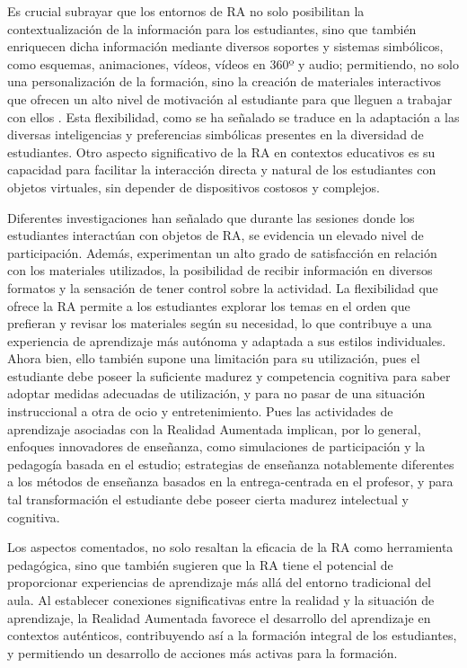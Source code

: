 \documentclass[spanish]{textolivre}
\begin{document}
Es crucial subrayar que los entornos de RA no solo posibilitan la contextualización de la información para los estudiantes, sino que también enriquecen dicha información mediante diversos soportes y sistemas simbólicos, como esquemas, animaciones, vídeos, vídeos en 360º y audio; permitiendo, no solo una personalización de la formación, sino la creación de materiales interactivos que ofrecen un alto nivel de motivación al estudiante para que lleguen a trabajar con ellos \cite{amores_valencia_2023,oueida2023augmented}. Esta flexibilidad, como se ha señalado se traduce en la adaptación a las diversas inteligencias y preferencias simbólicas presentes en la diversidad de estudiantes. Otro aspecto significativo de la RA en contextos educativos es su capacidad para facilitar la interacción directa y natural de los estudiantes con objetos virtuales, sin depender de dispositivos costosos y complejos.

Diferentes investigaciones han señalado que durante las sesiones donde los estudiantes interactúan con objetos de RA, se evidencia un elevado nivel de participación. Además, experimentan un alto grado de satisfacción en relación con los materiales utilizados, la posibilidad de recibir información en diversos formatos y la sensación de tener control sobre la actividad. La flexibilidad que ofrece la RA permite a los estudiantes explorar los temas en el orden que prefieran y revisar los materiales según su necesidad, lo que contribuye a una experiencia de aprendizaje más autónoma y adaptada a sus estilos individuales. Ahora bien, ello también supone una limitación para su utilización, pues el estudiante debe poseer la suficiente madurez y competencia cognitiva para saber adoptar medidas adecuadas de utilización, y para no pasar de una situación instruccional a otra de ocio y entretenimiento. Pues las actividades de aprendizaje asociadas con la Realidad Aumentada implican, por lo general, enfoques innovadores de enseñanza, como simulaciones de participación y la pedagogía basada en el estudio; estrategias de enseñanza notablemente diferentes a los métodos de enseñanza basados en la entrega-centrada en el profesor, y para tal transformación el estudiante debe poseer cierta madurez intelectual y cognitiva.

Los aspectos comentados, no solo resaltan la eficacia de la RA como herramienta pedagógica, sino que también sugieren que la RA tiene el potencial de proporcionar experiencias de aprendizaje más allá del entorno tradicional del aula. Al establecer conexiones significativas entre la realidad y la situación de aprendizaje, la Realidad Aumentada favorece el desarrollo del aprendizaje en contextos auténticos, contribuyendo así a la formación integral de los estudiantes, y permitiendo un desarrollo de acciones más activas para la formación.
\end{document}
